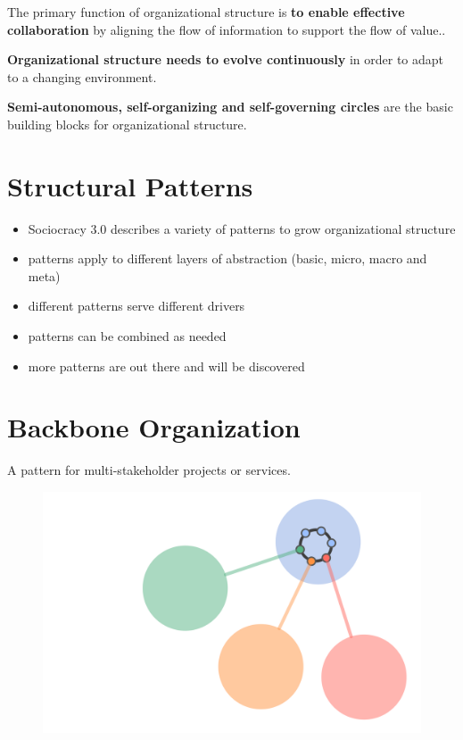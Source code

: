 The primary function of organizational structure is \textbf{to enable effective collaboration} by aligning the flow of information to support the flow of value..

\textbf{Organizational structure needs to evolve continuously} in order to adapt to a changing environment.

\textbf{Semi-autonomous, self-organizing and self-governing circles} are the basic building blocks for organizational structure.

\section{Structural Patterns}
\label{structuralpatterns}

\begin{itemize}
\item Sociocracy 3.0 describes a variety of patterns to grow organizational structure

\item patterns apply to different layers of abstraction (basic, micro, macro and meta)

\item different patterns serve different drivers

\item patterns can be combined as needed

\item more patterns are out there and will be discovered

\end{itemize}

\section{Backbone Organization}
\label{backboneorganization}

A pattern for multi-stakeholder projects or services.

\begin{figure}[htbp]
\centering
\includegraphics[keepaspectratio,width=\textwidth,height=0.75\textheight]{img/structural-patterns/backbone-organization.png}
\end{figure}

